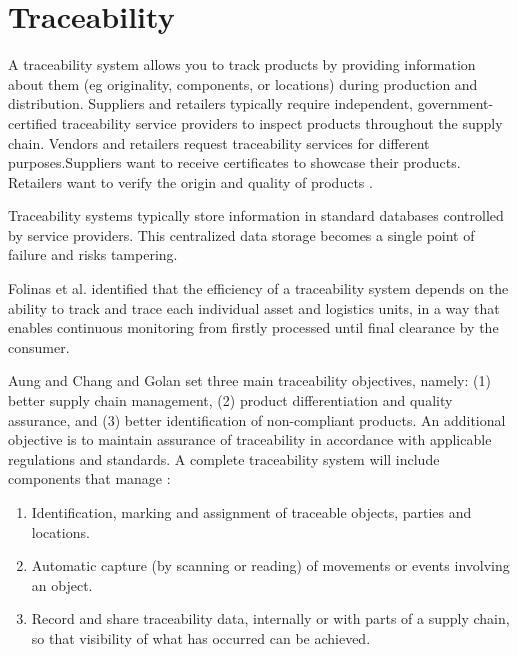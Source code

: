 \section{Traceability}\label{sec:traceability}
A traceability system allows you to track products by providing information about them (eg originality, components, or locations) during production and distribution. Suppliers and retailers typically require independent, government-certified traceability service providers to inspect products throughout the supply chain. Vendors and retailers request traceability services for different purposes.Suppliers want to receive certificates to showcase their products. Retailers want to verify the origin and quality of products \cite{lu2017adaptable}.

Traceability systems typically store information in standard databases controlled by service providers. This centralized data storage becomes a single point of failure and risks tampering.


Folinas et al. \cite{folinas2006traceability} identified that the efficiency of a traceability system depends on the ability to track and trace each individual asset and logistics units, in a way that enables continuous monitoring from firstly processed until final clearance by the consumer.

Aung and Chang \cite{aung2014traceability} and Golan \cite{golan2004traceability} set three main traceability objectives, namely: (1) better supply chain management, (2) product differentiation and quality assurance, and (3) better identification of non-compliant products. An additional objective is to maintain assurance of traceability in accordance with applicable regulations and standards. A complete traceability system will include components that manage \cite{vargas2017trazabilidad}:

\begin{enumerate}
\item Identification, marking and assignment of traceable objects, parties and locations.
\item Automatic capture (by scanning or reading) of movements or events involving an object.
\item Record and share traceability data, internally or with parts of a supply chain, so that visibility of what has occurred can be achieved.
\end{enumerate}